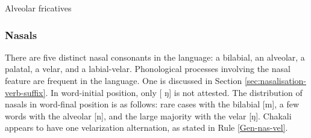 
\begin{table} 

\caption{Alveolar  fricatives\label{tab:alveolar-fricatives}}

\quad
{}


\end{table}


\subsubsection{Nasals}
\label{sec:PHON-nasal}

There are  five distinct nasal consonants in the language: a bilabial, an 
alveolar, a 
palatal, a velar, and a labial-velar. Phonological processes involving the 
nasal feature are frequent in the language. One is discussed in Section 
\ref{sec:nasalisation-verb-suffix}.  In word-initial position,  only  [{
ŋ}] 
is not attested. The distribution of nasals in word-final position is as 
follows:  rare cases with the bilabial [{m}], a few words with the 
alveolar [{n}], and the large majority with the velar [{ŋ}]. Chakali appears to have one velarization alternation, as stated in Rule \ref{Gen-nas-vel}.


